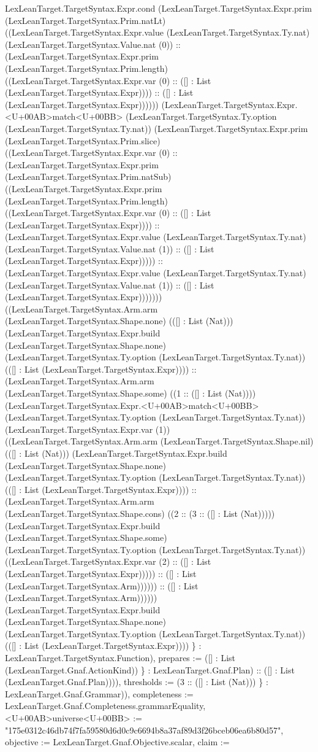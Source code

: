\documentclass[11pt]{article}
\begin{document}
LexLeanTarget.TargetSyntax.Expr.cond (LexLeanTarget.TargetSyntax.Expr.prim (LexLeanTarget.TargetSyntax.Prim.natLt) ((LexLeanTarget.TargetSyntax.Expr.value (LexLeanTarget.TargetSyntax.Ty.nat) (LexLeanTarget.TargetSyntax.Value.nat (0)) :: (LexLeanTarget.TargetSyntax.Expr.prim (LexLeanTarget.TargetSyntax.Prim.length) ((LexLeanTarget.TargetSyntax.Expr.var (0) :: ([] : List (LexLeanTarget.TargetSyntax.Expr)))) :: ([] : List (LexLeanTarget.TargetSyntax.Expr)))))) (LexLeanTarget.TargetSyntax.Expr.<U+00AB>match<U+00BB> (LexLeanTarget.TargetSyntax.Ty.option (LexLeanTarget.TargetSyntax.Ty.nat)) (LexLeanTarget.TargetSyntax.Expr.prim (LexLeanTarget.TargetSyntax.Prim.slice) ((LexLeanTarget.TargetSyntax.Expr.var (0) :: (LexLeanTarget.TargetSyntax.Expr.prim (LexLeanTarget.TargetSyntax.Prim.natSub) ((LexLeanTarget.TargetSyntax.Expr.prim (LexLeanTarget.TargetSyntax.Prim.length) ((LexLeanTarget.TargetSyntax.Expr.var (0) :: ([] : List (LexLeanTarget.TargetSyntax.Expr)))) :: (LexLeanTarget.TargetSyntax.Expr.value (LexLeanTarget.TargetSyntax.Ty.nat) (LexLeanTarget.TargetSyntax.Value.nat (1)) :: ([] : List (LexLeanTarget.TargetSyntax.Expr))))) :: (LexLeanTarget.TargetSyntax.Expr.value (LexLeanTarget.TargetSyntax.Ty.nat) (LexLeanTarget.TargetSyntax.Value.nat (1)) :: ([] : List (LexLeanTarget.TargetSyntax.Expr))))))) ((LexLeanTarget.TargetSyntax.Arm.arm (LexLeanTarget.TargetSyntax.Shape.none) (([] : List (Nat))) (LexLeanTarget.TargetSyntax.Expr.build (LexLeanTarget.TargetSyntax.Shape.none) (LexLeanTarget.TargetSyntax.Ty.option (LexLeanTarget.TargetSyntax.Ty.nat)) (([] : List (LexLeanTarget.TargetSyntax.Expr)))) :: (LexLeanTarget.TargetSyntax.Arm.arm (LexLeanTarget.TargetSyntax.Shape.some) ((1 :: ([] : List (Nat)))) (LexLeanTarget.TargetSyntax.Expr.<U+00AB>match<U+00BB> (LexLeanTarget.TargetSyntax.Ty.option (LexLeanTarget.TargetSyntax.Ty.nat)) (LexLeanTarget.TargetSyntax.Expr.var (1)) ((LexLeanTarget.TargetSyntax.Arm.arm (LexLeanTarget.TargetSyntax.Shape.nil) (([] : List (Nat))) (LexLeanTarget.TargetSyntax.Expr.build (LexLeanTarget.TargetSyntax.Shape.none) (LexLeanTarget.TargetSyntax.Ty.option (LexLeanTarget.TargetSyntax.Ty.nat)) (([] : List (LexLeanTarget.TargetSyntax.Expr)))) :: (LexLeanTarget.TargetSyntax.Arm.arm (LexLeanTarget.TargetSyntax.Shape.cons) ((2 :: (3 :: ([] : List (Nat))))) (LexLeanTarget.TargetSyntax.Expr.build (LexLeanTarget.TargetSyntax.Shape.some) (LexLeanTarget.TargetSyntax.Ty.option (LexLeanTarget.TargetSyntax.Ty.nat)) ((LexLeanTarget.TargetSyntax.Expr.var (2) :: ([] : List (LexLeanTarget.TargetSyntax.Expr))))) :: ([] : List (LexLeanTarget.TargetSyntax.Arm)))))) :: ([] : List (LexLeanTarget.TargetSyntax.Arm)))))) (LexLeanTarget.TargetSyntax.Expr.build (LexLeanTarget.TargetSyntax.Shape.none) (LexLeanTarget.TargetSyntax.Ty.option (LexLeanTarget.TargetSyntax.Ty.nat)) (([] : List (LexLeanTarget.TargetSyntax.Expr)))) \} : LexLeanTarget.TargetSyntax.Function), prepares := ([] : List (LexLeanTarget.Gnaf.ActionKind)) \} : LexLeanTarget.Gnaf.Plan) :: ([] : List (LexLeanTarget.Gnaf.Plan)))), thresholds := (3 :: ([] : List (Nat))) \} : LexLeanTarget.Gnaf.Grammar)), completeness := LexLeanTarget.Gnaf.Completeness.grammarEquality, <U+00AB>universe<U+00BB> := "175e0312c46db74f7fa59580d6d0c9c6694b8a37af89d3f26bceb06ea6b80d57", objective := LexLeanTarget.Gnaf.Objective.scalar, claim := 
\end{document}
